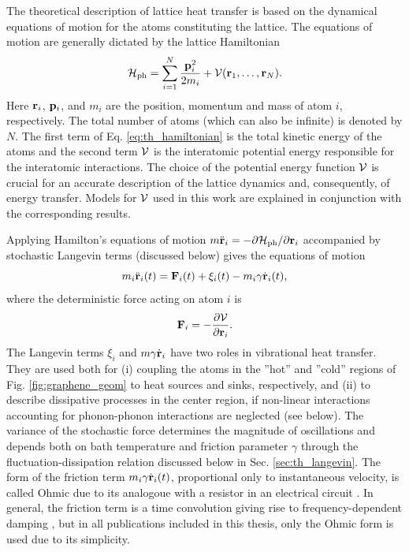 The theoretical description of lattice heat transfer is based on the dynamical equations of motion for the atoms constituting the lattice. The equations of motion are generally dictated by the lattice Hamiltonian \cite{ziman}
\begin{equation}
 \mathcal{H}_{\textrm{ph}} = \sum_{i=1}^N \frac{\mathbf{p}_i^2}{2m_i} + \mathcal{V}(\mathbf{r}_1,\dots,\mathbf{r}_N). \label{eq:th_hamiltonian}
\end{equation}
Here $\mathbf{r}_i$, $\mathbf{p}_i$, and $m_i$ are the position, momentum and mass of atom $i$, respectively. The total number of atoms (which can also be infinite) is denoted by $N$. The first term of Eq. \eqref{eq:th_hamiltonian} is the total kinetic energy of the atoms and the second term $\mathcal{V}$ is the interatomic potential energy responsible for the interatomic interactions. The choice of the potential energy function $\mathcal{V}$ is crucial for an accurate description of the lattice dynamics and, consequently, of energy transfer. Models for $\mathcal{V}$ used in this work are explained in conjunction with the corresponding results.

Applying Hamilton's equations of motion $m\ddot{\mathbf{r}}_i=-\partial \mathcal{H}_{\textrm{ph}}/\partial \mathbf{r}_i$ \cite{fetter} accompanied by stochastic Langevin terms (discussed below) gives the equations of motion
\begin{equation}
 m_i \ddot{\mathbf{r}}_i(t) = \mathbf{F}_i(t) + \xi_i(t) - m_i \gamma \dot{\mathbf{r}}_i(t), \label{eq:th_eom}
\end{equation}
where the deterministic force acting on atom $i$ is
\begin{equation}
 \mathbf{F}_i = - \frac{\partial \mathcal{V}}{\partial \mathbf{r}_i}. \label{eq:th_force}
\end{equation}
The Langevin terms $\xi_i$ and $m\gamma \dot{\mathbf{r}}_i$ have two roles in vibrational heat transfer. They are used both for (i) coupling the atoms in the ''hot'' and ''cold'' regions of Fig. \ref{fig:graphene_geom} to heat sources and sinks, respectively,  and (ii) to describe dissipative processes in the center region, if non-linear interactions accounting for phonon-phonon interactions are neglected (see below). The variance of the stochastic force determines the magnitude of oscillations and depends both on bath temperature and friction parameter $\gamma$ through the fluctuation-dissipation relation discussed below in Sec. \ref{sec:th_langevin}. The form of the friction term $m_i \gamma \dot{\mathbf{r}}_i(t)$, proportional only to instantaneous velocity, is called Ohmic due to its analogoue with a resistor in an electrical circuit \cite{weiss}. In general, the friction term is a time convolution giving rise to frequency-dependent damping \cite{weiss}, but in all publications included in this thesis, only the Ohmic form is used due to its simplicity.

